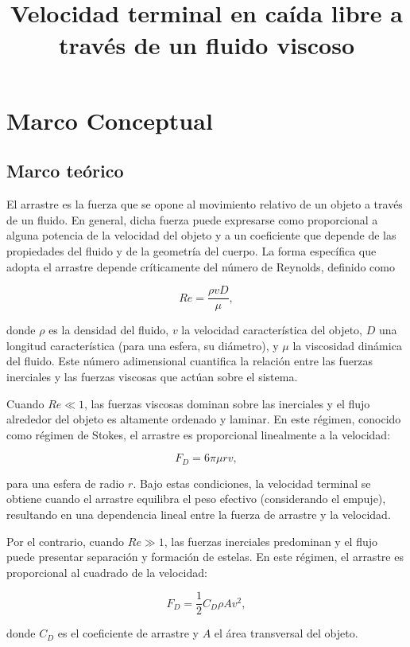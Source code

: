 \documentclass[12pt,a4paper]{config/myConfig}
\title{\Large $\ $\\ \bf Velocidad terminal en caída libre a través de un fluido 
viscoso} %
\author
\newcommand{\AssigmentNumber}{Laboratorio 1}%
\newcommand{\AssigmentDate}{6 Febrero, 2026} %
\begin{document}
\thispagestyle{myheadings}
\pagestyle{myheadings}
\markright{\tt \AssigmentNumber|    \AssigmentDate}%



\section{Marco Conceptual}
\label{sec:MARCO-CONCEPTUAL}
\subsection{Marco teórico}
\label{sec:MacroTeorico}

El arrastre es la fuerza que se opone al movimiento relativo de un objeto a través de un fluido. En general, dicha fuerza puede expresarse como proporcional a alguna potencia de la velocidad del objeto y a un coeficiente que depende de las propiedades del fluido y de la geometría del cuerpo. La forma específica que adopta el arrastre depende críticamente del número de Reynolds, definido como

\[
Re = \frac{\rho v D}{\mu},
\]

donde $\rho$ es la densidad del fluido, $v$ la velocidad característica del objeto, $D$ una longitud característica (para una esfera, su diámetro), y $\mu$ la viscosidad dinámica del fluido. Este número adimensional cuantifica la relación entre las fuerzas inerciales y las fuerzas viscosas que actúan sobre el sistema.

Cuando $Re \ll 1$, las fuerzas viscosas dominan sobre las inerciales y el flujo alrededor del objeto es altamente ordenado y laminar. En este régimen, conocido como régimen de Stokes, el arrastre es proporcional linealmente a la velocidad:

\[
F_D = 6\pi \mu r v,
\]

para una esfera de radio $r$. Bajo estas condiciones, la velocidad terminal se obtiene cuando el arrastre equilibra el peso efectivo (considerando el empuje), resultando en una dependencia lineal entre la fuerza de arrastre y la velocidad.

Por el contrario, cuando $Re \gg 1$, las fuerzas inerciales predominan y el flujo puede presentar separación y formación de estelas. En este régimen, el arrastre es proporcional al cuadrado de la velocidad:

\[
F_D = \frac{1}{2} C_D \rho A v^2,
\]

donde $C_D$ es el coeficiente de arrastre y $A$ el área transversal del objeto.
\end{document}
